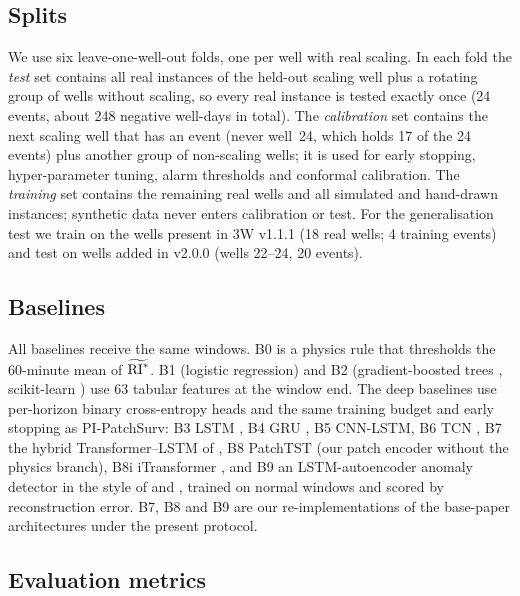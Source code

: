 \subsection{Splits}

We use six leave-one-well-out folds, one per well with real scaling. In each fold the \emph{test} set
contains all real instances of the held-out scaling well plus a rotating group of wells without scaling,
so every real instance is tested exactly once (24 events, about 248 negative well-days in total). The
\emph{calibration} set contains the next scaling well that has an event (never well~24, which holds 17 of
the 24 events) plus another group of non-scaling wells; it is used for early stopping, hyper-parameter
tuning, alarm thresholds and conformal calibration. The \emph{training} set contains the remaining real
wells and all simulated and hand-drawn instances; synthetic data never enters calibration or test. For the
generalisation test we train on the wells present in 3W v1.1.1 (18 real wells; 4 training events)
and test on wells added in v2.0.0 (wells 22--24, 20 events).

\subsection{Baselines}

All baselines receive the same windows. B0 is a physics rule that thresholds the 60-minute mean of
$\widetilde{\mathrm{RI}^{*}}$. B1 (logistic regression) and B2 (gradient-boosted trees \citep{friedman2001}, scikit-learn
\citep{pedregosa2011}) use 63 tabular features at the window end. The deep baselines use per-horizon
binary cross-entropy heads and the same training budget and early stopping as PI-PatchSurv: B3 LSTM
\citep{hochreiter1997}, B4 GRU \citep{cho2014}, B5 CNN-LSTM, B6 TCN \citep{bai2018}, B7 the hybrid
Transformer--LSTM of \citet{lai2026}, B8 PatchTST \citep{nie2023} (our patch encoder without the physics
branch), B8i iTransformer \citep{liu2024itrans}, and B9 an LSTM-autoencoder anomaly detector in the style
of \citet{aranha2024} and \citet{malhotra2016}, trained on normal windows and scored by reconstruction error. B7, B8 and
B9 are our re-implementations of the base-paper architectures under the present protocol.

\subsection{Evaluation metrics}


